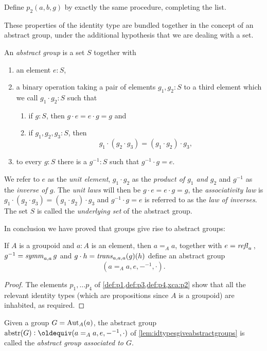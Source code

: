 \begin{xca}\label{xca:p2}
    Define $p_2(a,b,g)$ %
by exactly the same procedure, completing the list.
\end{xca}


These properties of the identity type are bundled together in the concept of an abstract group, under the additional hypothesis that we are dealing with a set.

  \begin{definition}\label{def:abstractgroup}
    An \emph{abstract group} is a set $S$ together with
\begin{enumerate}
\item an element $e:S$,
\item a binary operation taking a pair of elements $g_1,g_2:S$ to a third element which we call $g_1\cdot g_2:S$ such that
  \begin{enumerate}
  \item %
if $g:S$, then $g\cdot e=e\cdot g=g$ and
  \item %
if $g_1,g_2,g_3:S$, then
$$g_1\cdot(g_2\cdot g_3)=(g_1\cdot g_2)\cdot g_3,$$
  \end{enumerate}
\item %
to every $g:S$ there is a $g^{-1}:S$ such that $%
g^{-1}\cdot g=e$.
\end{enumerate}
We refer to $e$ as the \emph{unit element}, $g_1\cdot g_2$ as the \emph{product of $g_1$ and $g_2$} and $g^{-1}$ as the \emph{inverse of $g$}.  The \emph{unit laws} will then be $g\cdot e=e\cdot g=g$, the \emph{associativity law} is $g_1\cdot(g_2\cdot g_3)=(g_1\cdot g_2)\cdot g_3$ and $%
g^{-1}\cdot g=e$ is referred to as the \emph{law of inverses}.  The set $S$ is called the \emph{underlying set} of the abstract group.
  \end{definition}

In conclusion we have proved that groups give rise to abstract groups:
\newcommand{\abstr}{\mathrm{abstr}}
  \begin{lemma}\label{lem:idtypesgiveabstractgroups}
    If $A$ is a groupoid %
and $a:A$ is an element, then $a=_Aa$, together with $e=\mathop{{\it refl}_{a}}{}$, $g^{-1}=\mathop{\mathit{symm}}_{a,a}g$ and $g\cdot h=\mathop{\mathit{trans}}_{a,a,a}(g)(h)$ define an abstract group
$$(a=_Aa,e,{-}^{-1},\cdot).$$
  \end{lemma}
  \begin{proof}
    The elements $p_1,\dots p_4$ of \cref{def:p1,def:p3,def:p4,xca:p2} show that all the relevant identity types (which are propositions since $A$ is a groupoid) are inhabited, as required.
  \end{proof}
  \begin{definition}
    Given a group $G=\mathrm{Aut}_A(a)$, the abstract group $\abstr(G)\defequi (a=_Aa,e,{-}^{-1},\cdot)$ of \cref{lem:idtypesgiveabstractgroups} is called the \emph{abstract group associated to $G$}.
  \end{definition}


